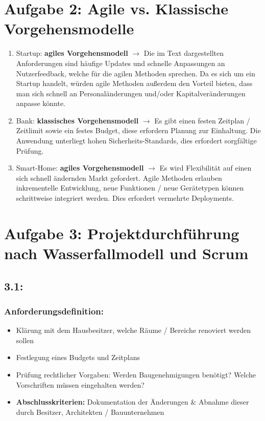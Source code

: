 \section*{Aufgabe 2: Agile vs. Klassische Vorgehensmodelle}

\begin{enumerate}
\item Startup: \textbf{agiles Vorgehensmodell} $\rightarrow$ Die im Text dargestellten Anforderungen sind häufige Updates und schnelle Anpassungen an Nutzerfeedback, welche für die agilen Methoden sprechen. Da es sich um ein Startup handelt, würden agile Methoden außerdem den Vorteil bieten, dass man sich schnell an Personaländerungen und/oder Kapitalveränderungen anpasse könnte.

\item Bank: \textbf{klassisches Vorgehensmodell} $\rightarrow$ Es gibt einen festen Zeitplan / Zeitlimit sowie ein festes Budget, diese erfordern Planung zur Einhaltung. Die Anwendung unterliegt hohen Sicherheits-Standards, dies erfordert sorgfältige Prüfung.   

\item Smart-Home: \textbf{agiles Vorgehensmodell} $\rightarrow$ Es wird Flexibilität auf einen sich schnell ändernden Markt gefordert. Agile Methoden erlauben inkrementelle Entwicklung, neue Funktionen / neue Gerätetypen können schrittweise integriert werden. Dies erfordert vermehrte Deployments.
\end{enumerate}

\section*{Aufgabe 3: Projektdurchführung nach Wasserfallmodell und Scrum}

\subsection*{3.1:}
\subsubsection*{Anforderungsdefinition:}
\begin{itemize}
\item Klärung mit dem Hausbesitzer, welche Räume / Bereiche renoviert werden sollen
\item Festlegung eines Budgets und Zeitplans
\item Prüfung rechtlicher Vorgaben: Werden Baugenehmigungen benötigt? Welche Vorschriften müssen eingehalten werden?
\item \textbf{Abschlusskriterien:} Dokumentation der Änderungen \& Abnahme dieser durch Besitzer, Architekten / Bauunternehmen
\end{itemize}

